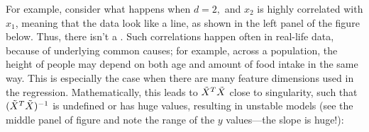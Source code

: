 For example, consider what happens when $d=2,$ and $x_2$ is highly
correlated with $x_1$, meaning that the data look like a line, as
shown in the left panel of the figure below.  Thus, there isn't a .  Such
correlations happen often in real-life data, because of underlying
common causes; for example, across a population, the height of people
may depend on both age and amount of food intake in the same way.
This is especially the case when there are many feature dimensions
used in the regression.  Mathematically, this leads to $\tilde{X}^T\tilde{X}$
close to singularity, such that $(\tilde{X}^T\tilde{X})^{-1}$ is undefined or has huge
values, resulting in unstable models (see the middle panel of figure
and note the range of the $y$ values---the slope is huge!):

